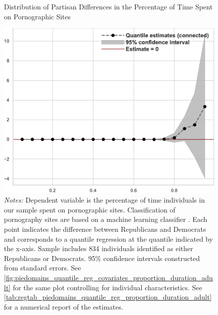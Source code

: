 \documentclass[12pt, letterpaper]{article}
\begin{document}
\begin{figure}[t]
	\centering
	\caption{Distribution of Partisan Differences in the Percentage of Time Spent on Pornographic Sites}
	\includegraphics[width=.55\linewidth]{../figs/piedomains_quantile_reg_proportion_duration_adult.pdf}
	\caption*{\footnotesize \emph{Notes:} 
		Dependent variable is the percentage of time individuals in our sample spent on pornographic sites.
		Classification of pornography sites are based on a machine learning classifier \citep{Chintalapati_piedomains_Predict_the_2022}.
		Each point indicates the difference between Republicans and Democrats and corresponds to a quantile regression at the quantile indicated by the x-axis.
		Sample includes 834 individuals identified as either Republicans or Democrats.
		95\% confidence intervals constructed from standard errors.
		See \cref{fig:piedomains_quantile_reg_covariates_proportion_duration_adult} for the same plot controlling for individual characteristics.
		See \cref{tab:regtab_piedomains_quantile_reg_proportion_duration_adult} for a numerical report of the estimates.
	}
	\label{fig:piedomains_quantile_reg_proportion_duration_adult}
\end{figure}
\end{document}
